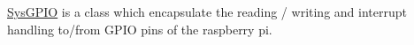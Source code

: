 \mbox{\hyperlink{classSysGPIO}{Sys\+G\+P\+IO}} is a class which encapsulate the reading / writing and interrupt handling to/from G\+P\+IO pins of the raspberry pi. 